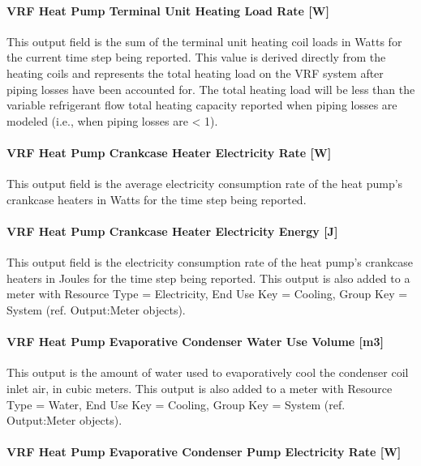 \paragraph{VRF Heat Pump Terminal Unit Heating Load Rate {[}W{]}}\label{vrf-heat-pump-terminal-unit-heating-load-rate-w}

This output field is the sum of the terminal unit heating coil loads in Watts for the current time step being reported. This value is derived directly from the heating coils and represents the total heating load on the VRF system after piping losses have been accounted for. The total heating load will be less than the variable refrigerant flow total heating capacity reported when piping losses are modeled (i.e., when piping losses are \textless{} 1).

\paragraph{VRF Heat Pump Crankcase Heater Electricity Rate {[}W{]}}\label{vrf-heat-pump-crankcase-heater-electric-power-w}

This output field is the average electricity consumption rate of the heat pump's crankcase heaters in Watts for the time step being reported.

\paragraph{VRF Heat Pump Crankcase Heater Electricity Energy {[}J{]}}\label{vrf-heat-pump-crankcase-heater-electric-energy-j}

This output field is the electricity consumption rate of the heat pump's crankcase heaters in Joules for the time step being reported. This output is also added to a meter with Resource Type = Electricity, End Use Key = Cooling, Group Key = System (ref. Output:Meter objects).

\paragraph{VRF Heat Pump Evaporative Condenser Water Use Volume {[}m3{]}}\label{vrf-heat-pump-evaporative-condenser-water-use-volume-m3}

This output is the amount of water used to evaporatively cool the condenser coil inlet air, in cubic meters. This output is also added to a meter with Resource Type = Water, End Use Key = Cooling, Group Key = System (ref. Output:Meter objects).

\paragraph{VRF Heat Pump Evaporative Condenser Pump Electricity Rate {[}W{]}}\label{vrf-heat-pump-evaporative-condenser-pump-electric-power-w}


